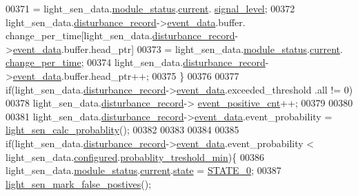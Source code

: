 \begin{DoxyCode}
00371                     = light\_sen\_data.\hyperlink{a00024_a5a53c391562b059eb744ac679f3765ca}{module\_status}.\hyperlink{a00017_ab8af48cdbba92b3ae39c4470e53af944}{current}.
      \hyperlink{a00017_abcdf2bc0c2e5a14863938ae28c3bc96e}{signal\_level};
00372             light\_sen\_data.\hyperlink{a00024_ac9b38e2c1d3f1013a88d33506c754152}{disturbance\_record}->\hyperlink{a00028_a8c0bda69e71ef674e60da47ad0be9ab0}{event\_data}.buffer.
      change\_per\_time[light\_sen\_data.\hyperlink{a00024_ac9b38e2c1d3f1013a88d33506c754152}{disturbance\_record}->\hyperlink{a00028_a8c0bda69e71ef674e60da47ad0be9ab0}{event\_data}.buffer.head\_ptr]
00373                     = light\_sen\_data.\hyperlink{a00024_a5a53c391562b059eb744ac679f3765ca}{module\_status}.\hyperlink{a00017_ab8af48cdbba92b3ae39c4470e53af944}{current}.
      \hyperlink{a00017_ad5c4f9a39d2a36632a53205ae8eb5a5d}{change\_per\_time};
00374             light\_sen\_data.\hyperlink{a00024_ac9b38e2c1d3f1013a88d33506c754152}{disturbance\_record}->\hyperlink{a00028_a8c0bda69e71ef674e60da47ad0be9ab0}{event\_data}.buffer.head\_ptr++;
00375             \}
00376 
00377             \textcolor{keywordflow}{if}(light\_sen\_data.\hyperlink{a00024_ac9b38e2c1d3f1013a88d33506c754152}{disturbance\_record}->\hyperlink{a00028_a8c0bda69e71ef674e60da47ad0be9ab0}{event\_data}.exceeded\_threshold
      .all != 0)
00378                 light\_sen\_data.\hyperlink{a00024_ac9b38e2c1d3f1013a88d33506c754152}{disturbance\_record}->
      \hyperlink{a00028_a7397b9d76d4b57500f27bb23d258a18a}{event\_positive\_cnt}++;
00379             
00380 
00381              light\_sen\_data.\hyperlink{a00024_ac9b38e2c1d3f1013a88d33506c754152}{disturbance\_record}->\hyperlink{a00028_a8c0bda69e71ef674e60da47ad0be9ab0}{event\_data}.event\_probability = 
      \hyperlink{a00047_acfaee257a4ad46d9d0ffb57f97d8f35f}{light\_sen\_calc\_probablity}();
00382 
00383 
00384 
00385              \textcolor{keywordflow}{if}(light\_sen\_data.\hyperlink{a00024_ac9b38e2c1d3f1013a88d33506c754152}{disturbance\_record}->\hyperlink{a00028_a8c0bda69e71ef674e60da47ad0be9ab0}{event\_data}.event\_probability
       < light\_sen\_data.\hyperlink{a00024_a94b2d1f6ea4ab334c74d24984dd27843}{configured}.\hyperlink{a00021_aa59261f74183d4f9e909ac425e0bea35}{probablity\_treshold\_min})\{
00386                  light\_sen\_data.\hyperlink{a00024_a5a53c391562b059eb744ac679f3765ca}{module\_status}.\hyperlink{a00017_ab8af48cdbba92b3ae39c4470e53af944}{current}.\hyperlink{a00017_a6b8d8e916bc56265a3fd279bd26b6d1b}{state} = 
      \hyperlink{a00021_ad6739dbbe5581cac99b7dc8a5e09949c}{STATE\_0};
00387                  \hyperlink{a00047_acef1622ec5c40fe90bf6184813716e34}{light\_sen\_mark\_false\_postives}();

\end{DoxyCode}
